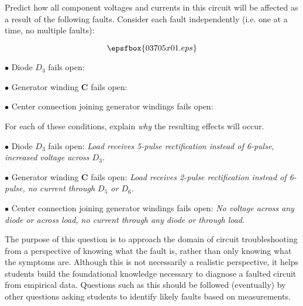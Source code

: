 

Predict how all component voltages and currents in this circuit will be affected as a result of the following faults.  Consider each fault independently (i.e. one at a time, no multiple faults):

$$\epsfbox{03705x01.eps}$$

\medskip
\item{$\bullet$} Diode $D_3$ fails open:
\vskip 5pt
\item{$\bullet$} Generator winding {\bf C} fails open:
\vskip 5pt
\item{$\bullet$} Center connection joining generator windings fails open:
\medskip

For each of these conditions, explain {\it why} the resulting effects will occur.







\medskip
\item{$\bullet$} Diode $D_3$ fails open: {\it Load receives 5-pulse rectification instead of 6-pulse, increased voltage across $D_3$.}
\vskip 5pt
\item{$\bullet$} Generator winding {\bf C} fails open: {\it Load receives 2-pulse rectification instead of 6-pulse, no current through $D_5$ or $D_6$.}
\vskip 5pt
\item{$\bullet$} Center connection joining generator windings fails open: {\it No voltage across any diode or across load, no current through any diode or through load.}
\medskip







The purpose of this question is to approach the domain of circuit troubleshooting from a perspective of knowing what the fault is, rather than only knowing what the symptoms are.  Although this is not necessarily a realistic perspective, it helps students build the foundational knowledge necessary to diagnose a faulted circuit from empirical data.  Questions such as this should be followed (eventually) by other questions asking students to identify likely faults based on measurements.




